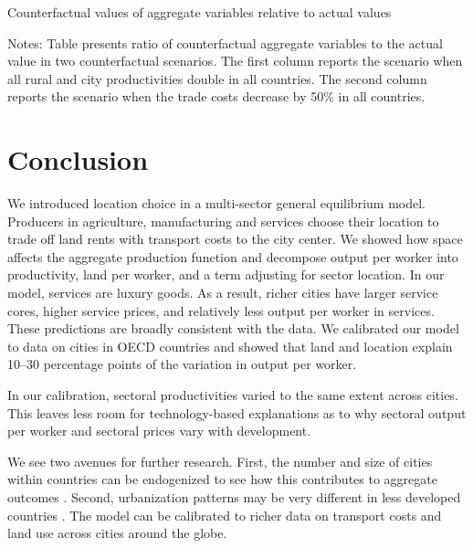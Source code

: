 \documentclass[12pt]{article}
\begin{document}
\begin{table}[h!]
  \begin{center}
  \caption{Counterfactual values of aggregate variables relative to actual values\label{tab:counterfactuals}}
  
  \end{center}
  \noindent \footnotesize{Notes: Table presents ratio of counterfactual aggregate variables to the actual value in two counterfactual scenarios. The first column reports the scenario when all rural and city productivities double in all countries. The second column reports the scenario when the trade costs decrease by 50\% in all countries.}
\end{table}


\section{Conclusion}
We introduced location choice in a multi-sector general equilibrium model. Producers in agriculture, manufacturing and services choose their location to trade off land rents with transport costs to the city center. We showed how space affects the aggregate production function and decompose output per worker into productivity, land per worker, and a term adjusting for sector location. In our model, services are luxury goods. As a result, richer cities have larger service cores, higher service prices, and relatively less output per worker in services. These predictions are broadly consistent with the data. We calibrated our model to data on cities in OECD countries and showed that land and location explain 10--30 percentage points of the variation in output per worker.

In our calibration, sectoral productivities varied to the same extent across cities. This leaves less room for technology-based explanations as to why sectoral output per worker and sectoral prices vary with development.

We see two avenues for further research. First, the number and size of cities within countries can be endogenized to see how this contributes to aggregate outcomes \cite{Desmet2013,Ramondo2016-qy}. Second, urbanization patterns may be very different in less developed countries \cite{Glaeser2014-gd,Harari2016-cx}. The model can be calibrated to richer data on transport costs and land use across cities around the globe.
\clearpage



\end{document}
